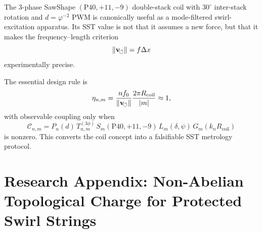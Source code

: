 The 3-phase SawShape $(\mathrm{P40},+11,-9)$ double-stack coil with $30^\circ$ inter-stack rotation and $d=\varphi^{-2}$ PWM is canonically useful as a mode-filtered swirl-excitation apparatus. Its SST value is not that it assumes a new force, but that it makes the frequency--length criterion
\[
\lVert\mathbf{v}_{\!\boldsymbol{\circlearrowleft}}\rVert=f\Delta x
\]
experimentally precise.

The essential design rule is
\[
\eta_{n,m}
=
\frac{n f_0}{\lVert\mathbf{v}_{\!\boldsymbol{\circlearrowleft}}\rVert}
\frac{2\pi R_{\mathrm{coil}}}{|m|}
\approx 1,
\]
with observable coupling only when
\[
\mathcal{C}_{n,m}
=
P_n(d)\,
T_{n,m}^{(3\phi)}\,
S_m(\mathrm{P40},+11,-9)\,
L_m(\delta,\psi)\,
G_m(k_nR_{\mathrm{coil}})
\]
is nonzero. This converts the coil concept into a falsifiable SST metrology protocol.

%
%
%
%
%



\section{Research Appendix: Non-Abelian Topological Charge for Protected Swirl Strings}
\label{app:nonabelian_topological_charge}

